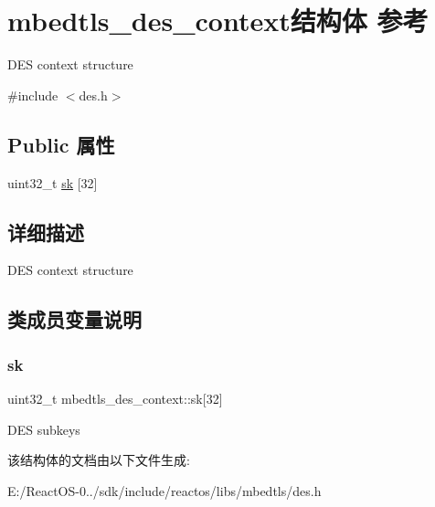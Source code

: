 \hypertarget{structmbedtls__des__context}{}\section{mbedtls\+\_\+des\+\_\+context结构体 参考}
\label{structmbedtls__des__context}


D\+ES context structure  




{\ttfamily \#include $<$des.\+h$>$}

\subsection*{Public 属性}
\begin{DoxyCompactItemize}
\item 
uint32\+\_\+t \hyperlink{structmbedtls__des__context_a964fb6a2eb38c2bdcd9ff1ac42b9378c}{sk} \mbox{[}32\mbox{]}
\end{DoxyCompactItemize}


\subsection{详细描述}
D\+ES context structure 

\subsection{类成员变量说明}
\mbox{\label{structmbedtls__des__context_a964fb6a2eb38c2bdcd9ff1ac42b9378c}} 
\subsubsection{\texorpdfstring{sk}{sk}}
{\footnotesize\ttfamily uint32\+\_\+t mbedtls\+\_\+des\+\_\+context\+::sk\mbox{[}32\mbox{]}}

D\+ES subkeys 

该结构体的文档由以下文件生成\+:\begin{DoxyCompactItemize}
\item 
E\+:/\+React\+O\+S-\/0../sdk/include/reactos/libs/mbedtls/des.\+h\end{DoxyCompactItemize}
